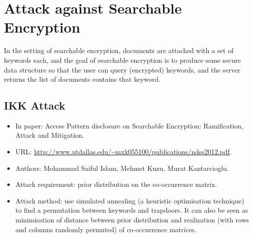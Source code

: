\documentclass[12pt]{article}
\begin{document}
\section{Attack against Searchable Encryption}
In the setting of searchable encryption, documents are attached with a set of keywords each, and the goal of searchable encryption is to produce some secure data structure so that the user can query (encrypted) keywords, and the server returns the list of documents contains that keyword.

\subsection{IKK Attack}
\begin{itemize}
	\item In paper: Access Pattern disclosure on Searchable Encryption: Ramification, Attack and Mitigation.
	
	\item URL: \url{http://www.utdallas.edu/~mxk055100/publications/ndss2012.pdf}.

	\item Authors: Mohammad Saiful Islam, Mehmet Kuzu, Murat Kantarcioglu.
	
	\item Attack requirement: prior distribution on the co-occurrence matrix.

	\item Attack method: use simulated annealing (a heuristic optimisation technique) to find a permutation between keywords and trapdoors. It can also be seen as minimisation of distance between prior distribution and realization (with rows and columns randomly permuted) of co-occurrence matrices.
\end{itemize}
\end{document}
